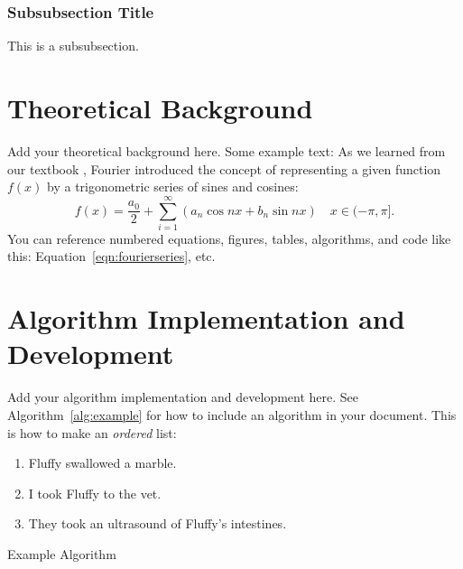\documentclass{article}
\begin{document}
\subsubsection{Subsubsection Title}
This is a subsubsection.

\section{Theoretical Background}
Add your theoretical background here. Some example text: As we learned from our textbook \cite{kutz_2013}, Fourier introduced the concept of representing a given function $f(x)$ by a trigonometric series of sines and cosines:
\begin{equation}
    f(x) = \frac{a_0}{2} + \sum_{i=1}^\infty \left(a_n\cos{nx} + b_n\sin{nx}\right) \quad x \in (-\pi,\pi].
    \label{eqn:fourierseries}
\end{equation}
You can reference numbered equations, figures, tables, algorithms, and code like this: Equation~\ref{eqn:fourierseries}, etc.

\section{Algorithm Implementation and Development}
Add your algorithm implementation and development here. See Algorithm~\ref{alg:example} for how to include an algorithm in your document. This is how to make an \textit{ordered} list:
\begin{enumerate}
    \item Fluffy swallowed a marble.
    \item I took Fluffy to the vet.
    \item They took an ultrasound of Fluffy's intestines.
\end{enumerate}

\begin{algorithm}
\begin{algorithmic}
    \ENDFOR
    \ELSE
        \ENDIF
    \ENDIF 
\end{algorithmic}
\caption{Example Algorithm}
\label{alg:example}
\end{algorithm}
\end{document}
